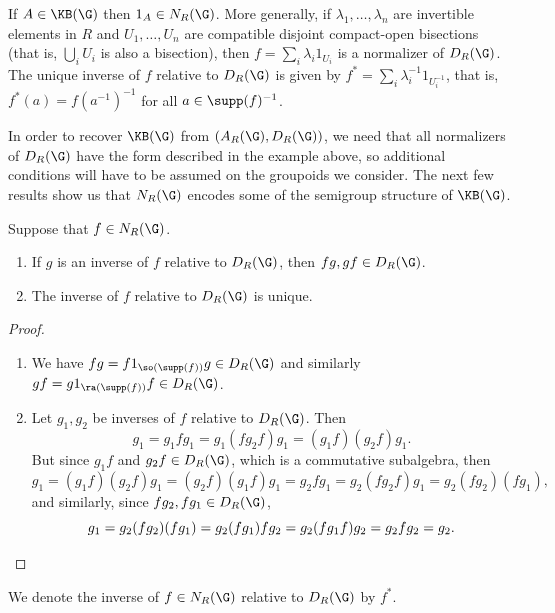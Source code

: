 \begin{example}
If $A\in\KB(\G)$ then $1_A\in N_R(\G)$. More generally, if $\lambda_1,\ldots,\lambda_n$ are invertible elements in $R$ and $U_1,\ldots,U_n$ are compatible disjoint compact-open bisections (that is, $\bigcup_i U_i$ is also a bisection), then $f=\sum_i \lambda_i1_{U_i}$ is a normalizer of $D_R(\G)$. The unique inverse of $f$ relative to $D_R(\G)$ is given by $f^*=\sum_i\lambda_i^{-1}1_{U_i^{-1}}$, that is, $f^*(a)=f(a^{-1})^{-1}$ for all $a\in\supp(f)^{-1}$.
\end{example}

In order to recover $\KB(\G)$ from $(A_R(\G),D_R(\G))$, we need that all normalizers of $D_R(\G)$ have the form described in the example above, so additional conditions will have to be assumed on the groupoids we consider. The next few results show us that $N_R(\G)$ encodes some of the semigroup structure of $\KB(\G)$.

\begin{lemma}\label{lemmanormalizerssteinbergalgebradiagonal1}
Suppose that $f\in N_R(\G)$.
\begin{enumerate}
\item[(a)] If $g$ is an inverse of $f$ relative to $D_R(\G)$, then $fg,gf\in D_R(\G)$.
\item[(b)] The inverse of $f$ relative to $D_R(\G)$ is unique.
\end{enumerate}
\end{lemma}
\begin{proof}
\begin{enumerate}
\item[(a)] We have $fg=f1_{\so(\supp(f))}g\in D_R(\G)$ and similarly $gf=g1_{\ra(\supp(f))}f\in D_R(\G)$.
\item[(b)] Let $g_1,g_2$ be inverses of $f$ relative to $D_R(\G)$. Then
\[g_1=g_1fg_1=g_1(fg_2f)g_1=(g_1f)(g_2f)g_1.\]
But since $g_1f$ and $g_2f\in D_R(\G)$, which is a commutative subalgebra, then
\[g_1=(g_1f)(g_2f)g_1=(g_2f)(g_1f)g_1=g_2fg_1=g_2(fg_2f)g_1=g_2(fg_2)(fg_1),\]
and similarly, since $fg_2,fg_1\in D_R(\G)$,
\[g_1=g_2(fg_2)(fg_1)=g_2(fg_1)fg_2=g_2(fg_1f)g_2=g_2fg_2=g_2.\qedhere\]
\end{enumerate}
\end{proof}

\begin{definition}
We denote the inverse of $f\in N_R(\G)$ relative to $D_R(\G)$ by $f^*$.
\end{definition}

